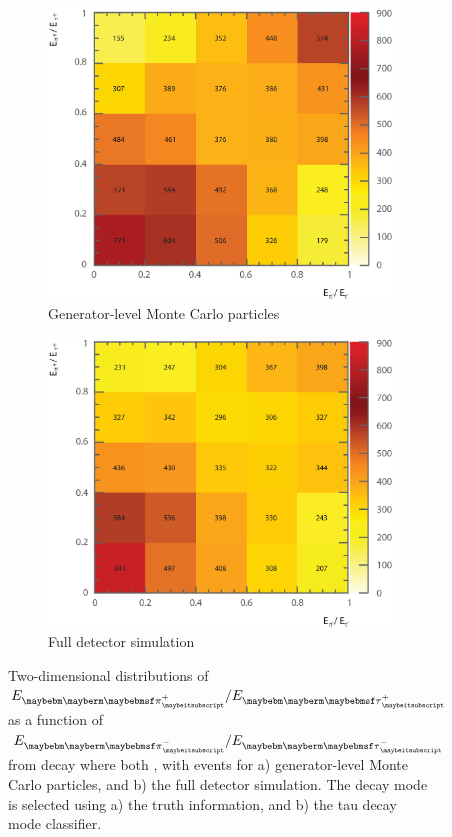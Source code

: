 \begin{figure}[htbp]
\centering %
\begin{subfigure}[b]{0.75\textwidth}
  \includegraphics[width=\textwidth]{tau/NoTimeAnalysis/2DMC2}
  \caption{Generator-level  Monte Carlo particles}
  \label{fig:TauSpin2DMC}
\end{subfigure}
\begin{subfigure}[b]{0.75\textwidth}
  \includegraphics[width=\textwidth]{tau/NoTimeAnalysis/2Dreco2}
  \caption{Full detector simulation}
  \label{fig:TauSpin2Dreco}
\end{subfigure}
\caption
{Two-dimensional distributions of $E_{\Ppiplus}/E_{\APtauon}$ as a function of $E_{\Ppiminus}/E_{\Ptauon}$ from \ZToTauTau decay where both \tauToPionBoth, with \eeZZQQ events for a) generator-level  Monte Carlo particles, and b) the full detector simulation. The \tauToPionBoth decay mode is selected using a) the truth information, and b) the tau decay mode classifier.}
\label{fig:TauSpin2D}
\end{figure}
